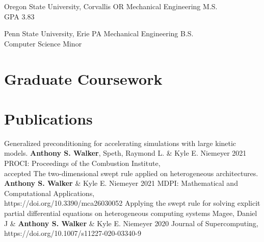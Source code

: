 \documentclass[%
               doublesided,
               paper=a4,
               fontsize=10pt
              ]{my-resume}
\begin{document}
{    
        {Oregon State University, Corvallis OR}
        {Mechanical Engineering M.S.\\
        GPA 3.83}{}
        
        {Penn State University, Erie PA}
        {Mechanical Engineering B.S.\\Computer Science Minor}{}

    
    
    \section[\faPaperclip]{Graduate Coursework}
    
    \section[\faFile]{Publications}
    \publication
	{Generalized preconditioning for accelerating simulations with large kinetic models.} %
	{\textbf{Anthony S. Walker}, Speth, Raymond L. \& Kyle E. Niemeyer} %
	{2021} %
	{PROCI: Proceedings of the Combustion Institute,\\ accepted} %
	{} %
    \publication
	{The two-dimensional swept rule applied on heterogeneous architectures.} %
	{\textbf{Anthony S. Walker} \& Kyle E. Niemeyer} %
	{2021} %
	{MDPI: Mathematical and Computational Applications,\\ https://doi.org/10.3390/mca26030052} %
	{} %
	\publication
	{Applying the swept rule for solving explicit partial differential equations on heterogeneous computing systems} %
	{Magee, Daniel J \& \textbf{Anthony S. Walker} \& Kyle E. Niemeyer} %
	{2020} %
	{Journal of Supercomputing,\\ https://doi.org/10.1007/s11227-020-03340-9} %
	{} %


}
\end{document}
